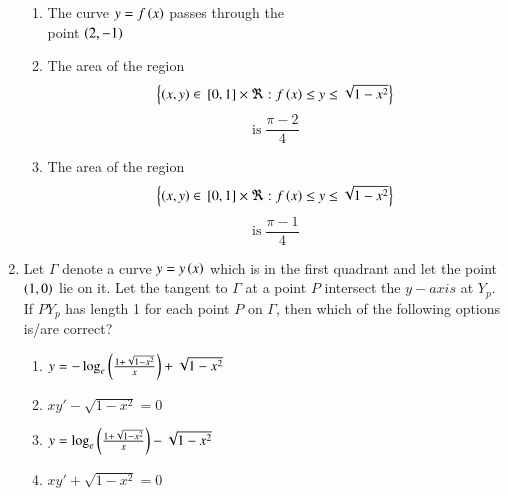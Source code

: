 \documentclass[journal,12pt,twocolumn,article]{IEEEtran}
\theoremstyle{remark}
\begin{document}
\begin{enumerate}[start = 6]
\begin{enumerate}
\item The curve $y=f\left(x\right)$ passes through the \\point $\left(2,-1\right)$
\item The area of the region 
\begin{align*}
\left\{\left(x,y\right) \in {}\left[0,1\right]\times\Re:f\left(x\right)\leq y \leq \sqrt{1-x^2}\right\} 
\end{align*}
$$\text{is} \;\frac{\pi-2}{4}$$
\item The area of the region 
\begin{align*}
\left\{\left(x,y\right) \in {}\left[0,1\right]\times\Re:f\left(x\right)\leq y \leq \sqrt{1-x^2}\right\}
\end{align*} 
$$\text{is}\; \frac{\pi-1}{4}$$
\end{enumerate}
\item Let $\Gamma$ denote a curve $y=y\left(x\right)$ which is in the first quadrant and let the point $\left(1,0\right)$ lie on it. Let the tangent to $\Gamma$ at a point $P$ intersect the $y-axis$ at $Y_p$. If $PY_p$ has length 1 for each point $P$ on $\Gamma$, then which of the following options is/are correct?
\hfill{}
\begin{enumerate}
\item $y=-\log_e{\left(\frac{1+\sqrt{1-x^2}}{x}\right)} + \sqrt{1-x^2}$
\item $xy'-\sqrt{1-x^2} = 0$
\item $y=\log_e{\left(\frac{1+\sqrt{1-x^2}}{x}\right)}-\sqrt{1-x^2}$
\item $xy'+\sqrt{1-x^2} = 0$
\end{enumerate}
\end{enumerate}
\end{document}
